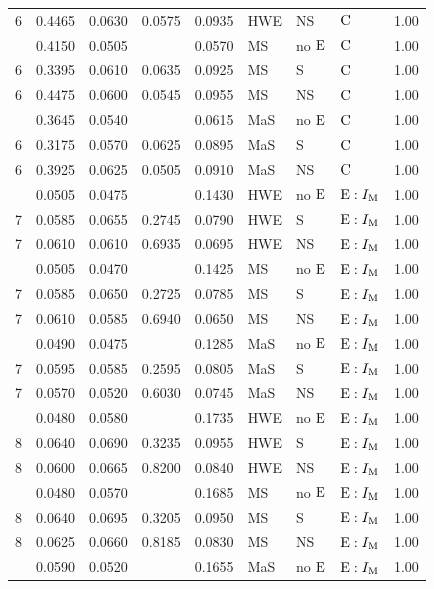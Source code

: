 \begin{longtable}[t]{lllllllll}
6 & 0.4465 & 0.0630 & 0.0575 & 0.0935 & HWE & NS & ${\rm C}$ & 1.00\\
\addlinespace
6 & 0.4150 & 0.0505 &  & 0.0570 & MS & no ${\rm E}$ & ${\rm C}$ & 1.00\\
6 & 0.3395 & 0.0610 & 0.0635 & 0.0925 & MS & S & ${\rm C}$ & 1.00\\
6 & 0.4475 & 0.0600 & 0.0545 & 0.0955 & MS & NS & ${\rm C}$ & 1.00\\
\addlinespace
6 & 0.3645 & 0.0540 &  & 0.0615 & MaS & no ${\rm E}$ & ${\rm C}$ & 1.00\\
6 & 0.3175 & 0.0570 & 0.0625 & 0.0895 & MaS & S & ${\rm C}$ & 1.00\\
6 & 0.3925 & 0.0625 & 0.0505 & 0.0910 & MaS & NS & ${\rm C}$ & 1.00\\
\addlinespace
7 & 0.0505 & 0.0475 &  & 0.1430 & HWE & no ${\rm E}$ & ${\rm E}:I_{{\rm M}}$ & 1.00\\
7 & 0.0585 & 0.0655 & 0.2745 & 0.0790 & HWE & S & ${\rm E}:I_{{\rm M}}$ & 1.00\\
7 & 0.0610 & 0.0610 & 0.6935 & 0.0695 & HWE & NS & ${\rm E}:I_{{\rm M}}$ & 1.00\\
\addlinespace
7 & 0.0505 & 0.0470 &  & 0.1425 & MS & no ${\rm E}$ & ${\rm E}:I_{{\rm M}}$ & 1.00\\
7 & 0.0585 & 0.0650 & 0.2725 & 0.0785 & MS & S & ${\rm E}:I_{{\rm M}}$ & 1.00\\
7 & 0.0610 & 0.0585 & 0.6940 & 0.0650 & MS & NS & ${\rm E}:I_{{\rm M}}$ & 1.00\\
\addlinespace
7 & 0.0490 & 0.0475 &  & 0.1285 & MaS & no ${\rm E}$ & ${\rm E}:I_{{\rm M}}$ & 1.00\\
7 & 0.0595 & 0.0585 & 0.2595 & 0.0805 & MaS & S & ${\rm E}:I_{{\rm M}}$ & 1.00\\
7 & 0.0570 & 0.0520 & 0.6030 & 0.0745 & MaS & NS & ${\rm E}:I_{{\rm M}}$ & 1.00\\
\addlinespace
8 & 0.0480 & 0.0580 &  & 0.1735 & HWE & no ${\rm E}$ & ${\rm E}:I_{{\rm M}}$ & 1.00\\
8 & 0.0640 & 0.0690 & 0.3235 & 0.0955 & HWE & S & ${\rm E}:I_{{\rm M}}$ & 1.00\\
8 & 0.0600 & 0.0665 & 0.8200 & 0.0840 & HWE & NS & ${\rm E}:I_{{\rm M}}$ & 1.00\\
\addlinespace
8 & 0.0480 & 0.0570 &  & 0.1685 & MS & no ${\rm E}$ & ${\rm E}:I_{{\rm M}}$ & 1.00\\
8 & 0.0640 & 0.0695 & 0.3205 & 0.0950 & MS & S & ${\rm E}:I_{{\rm M}}$ & 1.00\\
8 & 0.0625 & 0.0660 & 0.8185 & 0.0830 & MS & NS & ${\rm E}:I_{{\rm M}}$ & 1.00\\
\addlinespace
8 & 0.0590 & 0.0520 &  & 0.1655 & MaS & no ${\rm E}$ & ${\rm E}:I_{{\rm M}}$ & 1.00\\

\end{longtable}
